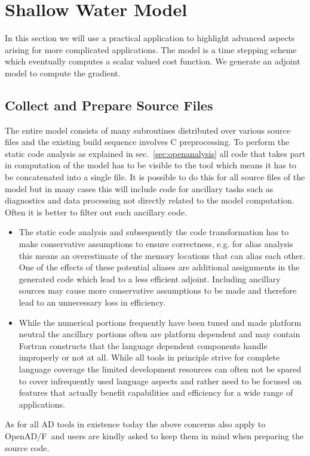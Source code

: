 \documentclass{book}
\newcommand{\OpenADF}{OpenAD/F}
\newcommand{\refsec}[1]{{sec.~\ref{#1}}}
\begin{document}
\section{Shallow Water Model}
In this section we will use a practical application to highlight 
advanced aspects arising for more complicated applications. 
The model is a time stepping scheme which eventually computes 
a scalar valued cost function. We generate an adjoint model 
to compute the gradient.  

\subsection{Collect and Prepare Source Files} 
The entire model consists of many subroutines distributed over various 
source files and the existing build sequence involves C preprocessing.
To perform the static code analysis as explained in \refsec{sec:openanalysis}
all code that takes part in computation of the model has to be visible 
to the tool which means it has to be concatenated into a single file. 
It is possible to do this for all source files of the model but in many 
cases this will include code for ancillary tasks such as diagnostics 
and data processing not directly related to the model computation.
Often it is better to filter out such ancillary code. 
\begin{itemize}
\item The static code analysis and subsequently the code transformation
has to make conservative assumptions to ensure 
correctness, e.g. for alias analysis this means an overestimate of 
the memory locations that can alias each other. One of the effects of these potential aliases
are additional assignments in the generated code  which lead to 
a less efficient adjoint. Including ancillary sources may cause more conservative 
assumptions to be made and therefore lead to an unnecessary loss in efficiency.
\item While the numerical portions frequently have been tuned and made platform 
neutral the ancillary portions often are platform dependent and may contain
Fortran constructs that the language dependent components handle improperly or 
not at all. While all tools in principle strive for complete language coverage 
the limited development resources can often not be spared to cover 
infrequently used language aspects and rather need to be focused on features 
that actually benefit capabilities and efficiency for a wide range of applications.
\end{itemize}
As for all AD tools in existence today the above concerns also apply to 
\OpenADF\ and  users are kindly asked to keep them in mind when
preparing the source code.
\end{document}
